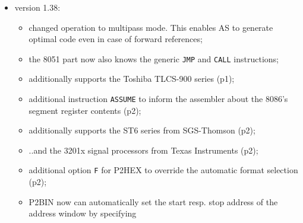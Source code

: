 \documentclass[12pt,twoside]{report}
\newcommand{\tty}[1]{{\tt #1}}
\newcommand{\asname}{{AS}}
\newcommand{\predefsym}[1]{{\tt (\_)#1}}
\begin{document}
\begin{itemize}
{\begin{itemize}
{            three possibilities for the termination record;}
      \item{additional functions \tty{ABS} and \tty{SGN};}
      \item{additional predefined symbols \predefsym{MOMFILE} and \predefsym{MOMLINE};}
      \item{additional option to print extended error messages;}
      \item{additional instruction \tty{IFUSED} and \tty{IFNUSED} to check
            whether a symbol has been used so far;}
      \item{The environment variables \tty{ASCMD, BINDCMD} etc. now
            optionally may contain the name of a file that
            provides more space for options;}
      \item{P2HEX can now generate the hex formats specified
            by Microchip (p4);}
      \item{a page length specification of 0 now allows to
            suppress automatic formfeeds in the assembly listing
            completely (p4);}
      \item{symbols defined in the command line now may be
            assigned an arbitrary value (p5).}
      \end{itemize}}
\item{version 1.38:
      \begin{itemize}
      \item{changed operation to multipass mode.  This enables
            \asname{} to generate optimal code even in case of forward
            references;}
      \item{the 8051 part now also knows the generic \tty{JMP} and
            \tty{CALL} instructions;}
      \item{additionally supports the Toshiba TLCS-900 series
            (p1);}
      \item{additional instruction \tty{ASSUME} to inform the assembler
            about the 8086's segment register contents (p2);}
      \item{additionally supports the ST6 series from
            SGS-Thomson (p2);}
      \item{..and the 3201x signal processors from Texas
            Instruments (p2);}
      \item{additional option \tty{F} for P2HEX to override the
            automatic format selection (p2);}
      \item{P2BIN now can automatically set the start resp.
            stop address of the address window by specifying
}
\end{itemize}}
\end{itemize}
\end{document}
